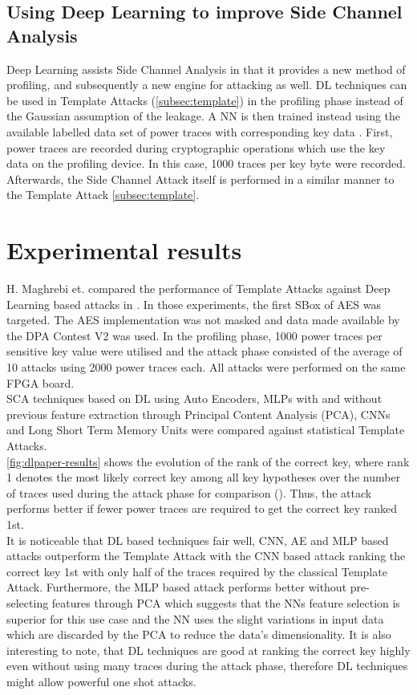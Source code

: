 \documentclass[journal]{IEEEtran}
\begin{document}
\subsection{Using Deep Learning to improve Side Channel Analysis}
Deep Learning assists Side Channel Analysis in that it provides a new method of profiling, and subsequently a new engine for attacking as well. DL techniques can be used in Template Attacks (\autoref{subsec:template}) in the profiling phase instead of the Gaussian assumption of the leakage. A NN is then trained instead using the available labelled data set of power traces with corresponding key data \cite{nn-aes:gilmore}. First, power traces are recorded during cryptographic operations which use the key data on the profiling device. In this case, 1000 traces per key byte were recorded. Afterwards, the Side Channel Attack itself is performed in a similar manner to the Template Attack \autoref{subsec:template}. 

\section{Experimental results}
\label{sec:exp-res}
H. Maghrebi et. compared the performance of Template Attacks against Deep Learning based attacks in \cite{breaking-crypto-dl:prouff}. In those experiments, the first SBox of AES was targeted. The AES implementation was not masked and data made available by the DPA Contest V2 \cite{dpacv2:web} was used. In the profiling phase, 1000 power traces per sensitive key value were utilised and the attack phase consisted of the average of 10 attacks using 2000 power traces each. All attacks were performed on the same FPGA board. \\
SCA techniques based on DL using Auto Encoders, MLPs with and without previous feature extraction through Principal Content Analysis (PCA), CNNs and Long Short Term Memory Units were compared against statistical Template Attacks. \\ 
\autoref{fig:dlpaper-results} shows the evolution of the rank of the correct key, where rank 1 denotes the most likely correct key among all key hypotheses over the number of traces used during the attack phase for comparison (\cite{sca-framework:standaert}). Thus, the attack performs better if fewer power traces are required to get the correct key ranked 1st. \\
It is noticeable that DL based techniques fair well, CNN, AE and MLP based attacks outperform the Template Attack with the CNN based attack ranking the correct key 1st with only half of the traces required by the classical Template Attack. Furthermore, the MLP based attack performs better without pre-selecting features through PCA which suggests that the NNs feature selection is superior for this use case and the NN uses the slight variations in input data which are discarded by the PCA to reduce the data's dimensionality. It is also interesting to note, that DL techniques are good at ranking the correct key highly even without using many traces during the attack phase, therefore DL techniques might allow powerful one shot attacks. 
\end{document}
